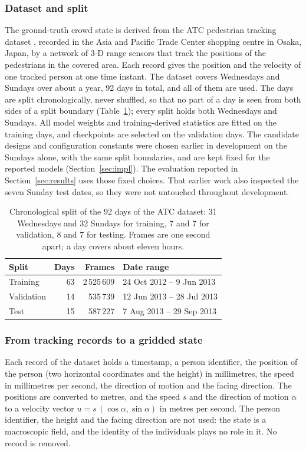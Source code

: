 \documentclass[english, 12pt, a4paper, elec, utf8, a-2b, online]{aaltothesis}
\begin{document}
\subsubsection{Dataset and split}

The ground-truth crowd state is derived from the ATC pedestrian tracking dataset
\cite{brscic2013atc}, recorded in the Asia and Pacific Trade Center shopping centre in Osaka, Japan, by a
network of 3-D range sensors that track the positions of the pedestrians in the
covered area.
Each record gives the position and the velocity of one tracked person at one
time instant. The dataset covers Wednesdays and Sundays over about a year, 92
days in total, and all of them are used. The days are split chronologically,
never shuffled, so that no part of a day is seen from both sides of a split
boundary (Table~\ref{tab:split}); every split holds both Wednesdays and Sundays.
All model weights and training-derived statistics are fitted on the training
days, and checkpoints are selected on the validation days. The candidate
designs and configuration constants were chosen earlier in development on the
Sundays alone, with the same split boundaries, and are kept fixed for the
reported models (Section~\ref{sec:impl}). The evaluation reported in
Section~\ref{sec:results} uses those fixed choices. That earlier work also
inspected the seven Sunday test dates, so they were not untouched throughout
development.

\begin{table}[htb]
	\centering
	\caption{Chronological split of the 92 days of the ATC dataset: 31 Wednesdays
	and 32 Sundays for training, 7 and 7 for validation, 8 and 7 for testing.
	Frames are one second apart; a day covers about eleven hours.}
	\label{tab:split}
	\begin{tabular}{lrrl}
		\hline
		Split & Days & Frames & Date range \\
		\hline
		Training   & 63 & 2\,525\,609 & 24 Oct 2012 -- 9 Jun 2013 \\
		Validation & 14 &   535\,739  & 12 Jun 2013 -- 28 Jul 2013 \\
		Test       & 15 &   587\,227  & 7 Aug 2013 -- 29 Sep 2013 \\
		\hline
	\end{tabular}
\end{table}

\subsubsection{From tracking records to a gridded state}
\label{sec:gridding}
Each record of the dataset holds a timestamp, a person identifier, the
position of the person (two horizontal coordinates and the height) in millimetres, the speed in millimetres per second, the
direction of motion and the facing direction. The positions are converted to
metres, and the speed $s$ and the direction of motion $\alpha$ to a velocity
vector $u = s\,(\cos\alpha, \sin\alpha)$ in metres per second. The person
identifier, the height and the facing direction are not used: the state is a
macroscopic field, and the identity of the individuals plays no role in it. No
record is removed.
\end{document}
